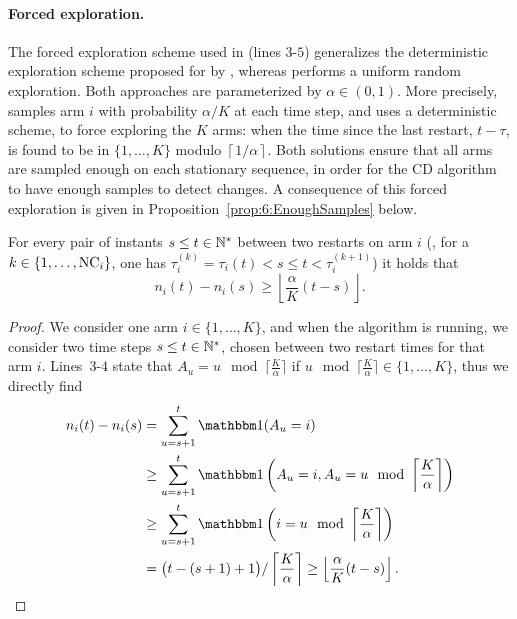\paragraph{Forced exploration.}

The forced exploration scheme used in \GLRklUCB{} (lines $3$-$5$) generalizes the deterministic exploration scheme proposed for \MUCB{} by \cite{CaoZhenKvetonXie18}, whereas \CUSUMUCB{} performs a uniform random exploration.
Both approaches are parameterized by $\alpha\in(0,1)$.
More precisely, \CUSUMUCB{} samples arm $i$ with probability $\alpha/K$ at each time step,
and \MUCB{} uses a deterministic scheme, to force exploring the $K$ arms: when the time since the last restart, $t - \tau$, is found to be in $\{1,\dots,K\}$ modulo $\left\lceil 1/\alpha \right\rceil$.
Both solutions ensure that all arms are sampled enough on each stationary sequence, in order for the CD algorithm to have enough \iid{} samples to detect changes.
%
A consequence of this forced exploration is given in Proposition~\ref{prop:6:EnoughSamples} below.

\begin{proposition}\label{prop:6:EnoughSamples}
    For every pair of instants $s \leq t\in\mathbb{N}^*$ between two restarts on arm $i$ (\ie, for a $k\in\{1,\dots,\text{NC}_i\}$, one has $\tau_i^{(k)} = \tau_i(t) < s \leq t < \tau_i^{(k+1)}$) it holds that
    \begin{equation}
        n_i(t) - n_i(s) \geq \left\lfloor \frac{\alpha}{K} (t-s) \right\rfloor.
    \end{equation}
\end{proposition}

\begin{proof}
    We consider one arm $i\in\{1,\dots,K\}$, and when the \GLRklUCB{} algorithm is running,
    we consider two time steps $s\leq t\in\mathbb{N}^*$, chosen between two restart times for that arm $i$.
    Lines~$3$-$4$ state that $A_u = u \mod \lceil \frac{K}{\alpha} \rceil$
    if $u \mod \lceil \frac{K}{\alpha} \rceil \in \{1,\dots,K\}$,
    thus we directly find
    \begin{align*}
        n_i(t) - n_i(s)
        & = \sum_{u=s+1}^{t} \indic(A_u = i) \\
        & \geq \sum_{u=s+1}^{t} \indic\left(A_u = i, A_u = u \mod \left\lceil \frac{K}{\alpha} \right\rceil\right) \\
        & \geq \sum_{u=s+1}^{t} \indic\left(i = u \mod \left\lceil \frac{K}{\alpha} \right\rceil\right) \\
        & = \bigl(t - (s+1) + 1\bigr) / \left\lceil \frac{K}{\alpha} \right\rceil
        \geq \left\lfloor \frac{\alpha}{K} (t - s) \right\rfloor.
    \end{align*}
\end{proof}


